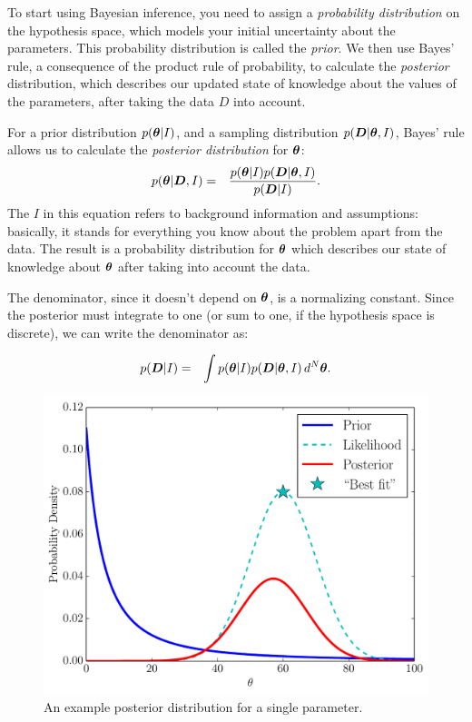 To start using Bayesian inference, you need to assign a {\it probability
distribution} on the hypothesis space, which models your initial uncertainty
about the parameters. This probability distribution is called the {\it prior}.
We then use Bayes' rule, a consequence of the product rule of probability,
to calculate the {\it posterior} distribution, which describes our updated
state of knowledge about the values of the parameters, after taking the data
$D$ into account.

For a prior distribution $p(\boldsymbol{\theta} | I)$, and a sampling
distribution $p(\boldsymbol{D} | \boldsymbol{\theta}, I)$, Bayes' rule allows us to calculate
the {\it posterior distribution} for $\boldsymbol{\theta}$:
\begin{eqnarray}
p(\boldsymbol{\theta} | \boldsymbol{D}, I) &=& \frac{p(\boldsymbol{\theta} | I)p(\boldsymbol{D} | \boldsymbol{\theta}, I)}{p(\boldsymbol{D} | I)}.
\end{eqnarray}
The $I$ in this equation refers to background information and assumptions:
basically, it stands for everything you know about the problem apart from the
data. The result is a probability distribution for $\boldsymbol{\theta}$ which describes
our state of knowledge about $\boldsymbol{\theta}$ after taking into account the data.

The denominator, since it doesn't depend on $\boldsymbol{\theta}$, is a normalizing
constant. Since the posterior must integrate to one (or sum to one, if the
hypothesis space is discrete), we can write the denominator as:

\begin{eqnarray}
p(\boldsymbol{D} | I) &=& \int p(\boldsymbol{\theta} | I)p(\boldsymbol{D} | \boldsymbol{\theta}, I) \, d^N \boldsymbol{\theta}.
\end{eqnarray}


\begin{figure}
\begin{center}
\includegraphics[scale=0.5]{bayes.pdf}
\caption{An example posterior distribution for a single parameter.
\label{fig:bayes}}
\end{center}
\end{figure}


